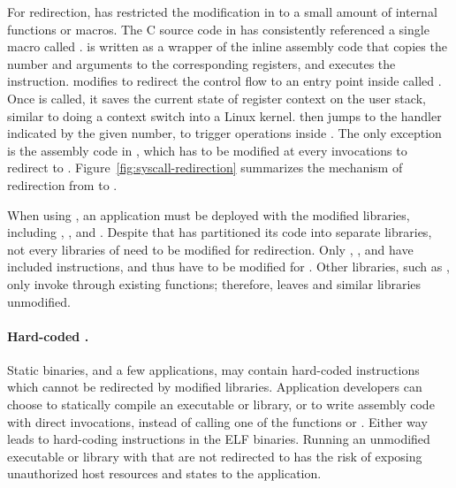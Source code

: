 For \linuxapi{} redirection,
\graphene{} has restricted the modification in \glibc{}
to a small amount of
internal functions or macros.
The C source code in \glibc{} has consistently referenced a single macro called
.
 is written as a wrapper of the inline assembly code
that copies the \linuxapi{} number and arguments to the corresponding registers,
and executes the  instruction.
\graphene{} modifies 
to redirect the control flow to
an entry point inside \thelibos{} called .
Once  is called, it saves the current state of register context on the user stack, similar to doing a context switch into a Linux kernel.
 then jumps to the \linuxapi{} handler
indicated by the given \linuxapi{} number, to trigger operations inside \thelibos{}.
The only exception is the assembly code in \glibc{}, which has
to be modified at every \linuxapi{} invocations to redirect to .
Figure~\ref{fig:syscall-redirection} summarizes the mechanism of \linuxapi{} redirection
from \glibc{} to \thelibos{}.


When using \graphene{}, an application must be deployed with the modified \libc{} libraries,
including , \libpthread{}, and \libdl{}.
Despite that \glibc{} has partitioned its code into separate libraries, not every libraries of \glibc{} need to be modified for \linuxapi{} redirection.
Only , \libpthread{}, and \libdl{} have included  instructions,
and thus have to be modified for \graphene{}.
Other \libc{} libraries, such as ,
only invoke \linuxapis{} through existing \libc{} functions;
therefore, \graphene{} leaves  and similar \libc{} libraries unmodified.



\paragraph{Hard-coded \linuxapis{}.}
Static binaries, and a few applications, may contain hard-coded  instructions
which cannot be redirected by modified \libc{} libraries.
Application developers can choose to statically compile an executable or library,
or to write assembly code
with direct \linuxapi{} invocations, instead of calling
one of the \libc{} functions or .
Either way leads to hard-coding  instructions in the ELF binaries.
Running an unmodified executable or library
with \linuxapis{} that are not redirected to \thelibos{}
has the risk of exposing
unauthorized host resources and states
to the application.


